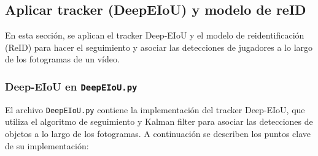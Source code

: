 \documentclass[12pt, a4paper, twoside]{article}
\begin{document}
	
	
	
	\subsection{Aplicar tracker (DeepEIoU) y modelo de reID}
	
	En esta sección, se aplican el tracker Deep-EIoU y el modelo de reidentificación (ReID) para hacer el seguimiento y asociar las detecciones de jugadores a lo largo de los fotogramas de un vídeo.
	
	\subsubsection{Deep-EIoU en \texttt{DeepEIoU.py}}
	
	El archivo \texttt{DeepEIoU.py} contiene la implementación del tracker Deep-EIoU, que utiliza el algoritmo de seguimiento y Kalman filter para asociar las detecciones de objetos a lo largo de los fotogramas. A continuación se describen los puntos clave de su implementación:
	
\end{document}
